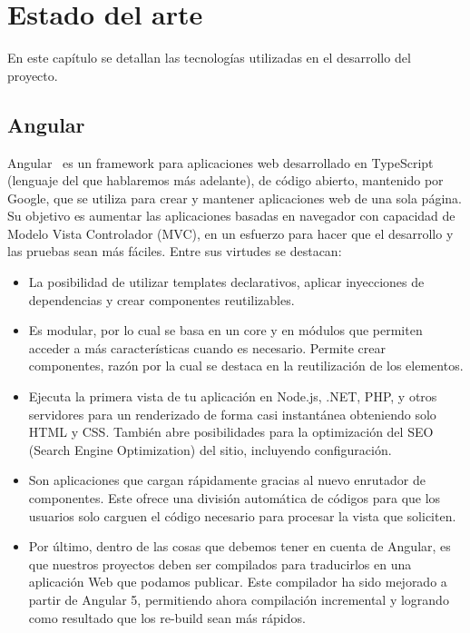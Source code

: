 \documentclass[a4paper, 12pt]{book}
\begin{document}
\cleardoublepage
\chapter{Estado del arte}
\label{chap:estado}

En este capítulo se detallan las tecnologías utilizadas en el desarrollo del proyecto.



\section{Angular} 
\label{sec:Angular}
Angular~\cite{angular} es un framework para aplicaciones web desarrollado en TypeScript (lenguaje del que hablaremos más adelante), de código abierto, mantenido por Google, que se utiliza para crear y mantener aplicaciones web de una sola página. Su objetivo es aumentar las aplicaciones basadas en navegador con capacidad de Modelo Vista Controlador (MVC), en un esfuerzo para hacer que el desarrollo y las pruebas sean más fáciles.
\vfill
Entre sus virtudes se destacan:
\begin{itemize}
\item La posibilidad de utilizar templates declarativos, aplicar inyecciones de dependencias y crear componentes reutilizables.

\item Es modular, por lo cual se basa en un core y en módulos que permiten acceder a más características cuando es necesario. Permite crear componentes, razón por la cual se destaca en la reutilización de los elementos.


\item Ejecuta la primera vista de tu aplicación en Node.js, .NET, PHP, y otros servidores para un renderizado de forma casi instantánea obteniendo solo HTML y CSS. También abre posibilidades para la optimización del SEO (Search Engine Optimization) del sitio, incluyendo configuración.

\item Son aplicaciones que cargan rápidamente gracias al nuevo enrutador de componentes. Este ofrece una división automática de códigos para que los usuarios solo carguen el código necesario para procesar la vista que soliciten.

\item Por último, dentro de las cosas que debemos tener en cuenta de Angular, es que nuestros proyectos deben ser compilados para traducirlos en una aplicación Web que podamos publicar. Este compilador ha sido mejorado a partir de Angular 5, permitiendo ahora compilación incremental y logrando como resultado que los re-build sean más rápidos.
\end{itemize}
\end{document}
